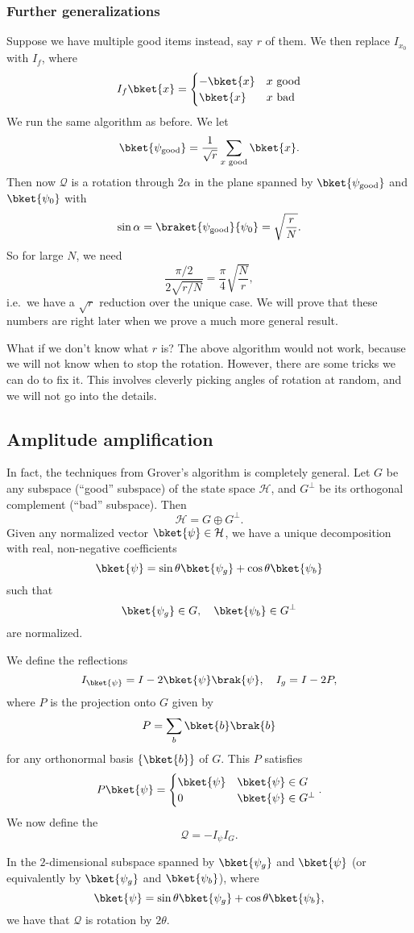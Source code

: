 \documentclass[a4paper]{article}
\begin{document}
\subsubsection*{Further generalizations}
Suppose we have multiple good items instead, say $r$ of them. We then replace $I_{x_0}$ with $I_f$, where
\[
  I_f \bket{x} =
  \begin{cases}
    -\bket{x} & x\text{ good}\\
    \bket{x} & x\text{ bad}
  \end{cases}
\]
We run the same algorithm as before. We let
\[
  \bket{\psi_{\mathrm{good}}} = \frac{1}{\sqrt{r}} \sum_{x\text{ good}} \bket{x}.
\]
Then now $\mathcal{Q}$ is a rotation through $2\alpha$ in the plane spanned by $\bket{\psi_{\mathrm{good}}}$ and $\bket{\psi_0}$ with
\[
  \sin \alpha = \braket{\psi_{\mathrm{good}}}{\psi_0} = \sqrt{\frac{r}{N}}.
\]
So for large $N$, we need
\[
  \frac{\pi/2}{2\sqrt{r/N}} = \frac{\pi}{4} \sqrt{\frac{N}{r}},
\]
i.e.\ we have a $\sqrt{r}$ reduction over the unique case. We will prove that these numbers are right later when we prove a much more general result.

What if we don't know what $r$ is? The above algorithm would not work, because we will not know when to stop the rotation. However, there are some tricks we can do to fix it. This involves cleverly picking angles of rotation at random, and we will not go into the details.

\subsection{Amplitude amplification}
In fact, the techniques from Grover's algorithm is completely general. Let $G$ be any subspace (``good'' subspace) of the state space $\mathcal{H}$, and $G^\perp$ be its orthogonal complement (``bad'' subspace). Then
\[
  \mathcal{H} = G \oplus G^\perp.
\]
Given any normalized vector $\bket{\psi} \in \mathcal{H}$, we have a unique decomposition with real, non-negative coefficients
\[
  \bket{\psi} = \sin \theta \bket{\psi_g} + \cos \theta \bket{\psi_b}
\]
such that
\[
  \bket{\psi_g} \in G,\quad \bket{\psi_b} \in G^\perp
\]
are normalized.

We define the reflections
\[
  I_{\bket{\psi}} = I -2\bket{\psi}\brak{\psi}, \quad I_g = I - 2P,
\]
where $P$ is the projection onto $G$ given by
\[
  P = \sum_b \bket{b}\brak{b}
\]
for any orthonormal basis $\{\bket{b}\}$ of $G$. This $P$ satisfies
\[
  P \bket{\psi} =
  \begin{cases}
    \bket{\psi} & \bket{\psi} \in G\\
    0 & \bket{\psi} \in G^\perp
  \end{cases}.
\]
We now define the 
\[
  \mathcal{Q} = - I_\psi I_G.
\]
\begin{thm}
  In the $2$-dimensional subspace spanned by $\bket{\psi_g}$ and $\bket{\psi}$ (or equivalently by $\bket{\psi_g}$ and $\bket{\psi_b}$), where
  \[
    \bket{\psi} = \sin \theta \bket{\psi_g} + \cos \theta \bket{\psi_b},
  \]
  we have that $\mathcal{Q}$ is rotation by $2 \theta$.
\end{thm}
\end{document}
